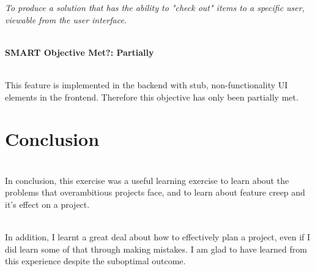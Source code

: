 \documentclass[../main.tex]{subfiles}
\begin{document}
\textit{To produce a solution that has the ability to "check out" items to a
    specific user, viewable from the user interface.}

\noindent \\ \textbf{SMART Objective Met?: Partially}

\noindent \\ This feature is implemented in the backend with stub, non-functionality
UI elements in the frontend. Therefore this objective has only been partially met.


\begin{comment}
1. High contrast UI
2. Dark theme
3. No audio cues
\end{comment}




\section{Conclusion}

\noindent \\ In conclusion, this exercise was a useful learning exercise to learn about the problems
that overambitious projects face, and to learn about feature creep and it's effect on a project.

\noindent \\ In addition, I learnt a great deal about how to effectively plan a project, even if I did learn
some of that through making mistakes. I am glad to have learned from this experience despite
the suboptimal outcome.
\end{document}
